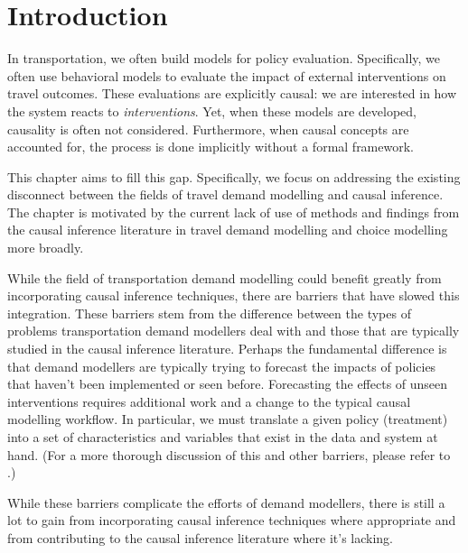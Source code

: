\section{Introduction}
\label{sec:intro}

In transportation, we often build models for policy evaluation.
Specifically, we often use behavioral models to evaluate the impact of external interventions on travel outcomes.
These evaluations are explicitly causal: we are interested in how the
system reacts to \textit{interventions}.
Yet, when these models are
developed, causality is often not considered. Furthermore, when
causal concepts are accounted for, the process is done implicitly without a
formal framework.

This chapter aims to fill this gap.
Specifically, we focus on addressing the existing disconnect between the fields of travel demand modelling and causal inference.
The chapter is motivated by the current lack of use of methods and findings from
the causal inference literature in travel demand modelling and choice modelling more broadly.

While the field of transportation demand modelling could benefit greatly from
incorporating causal inference techniques, there are barriers that have slowed this integration.
These barriers stem from the difference between the types of problems transportation demand modellers deal with and those that are typically studied in the causal inference literature.
Perhaps the fundamental difference is that demand modellers are typically trying to forecast the impacts of policies that haven't been implemented or seen before.
Forecasting the effects of unseen interventions requires additional work and a change to the typical causal modelling workflow.
In particular, we must translate a given policy (treatment) into a set of characteristics and variables that exist in the data and system at hand.
(For a more thorough discussion of this and other barriers, please refer to \citet{brathwaite_2018_causal}.)

While these barriers complicate the efforts of demand modellers, there is still a lot to gain from
incorporating causal inference techniques where appropriate and from contributing
to the causal inference literature where it's lacking.

